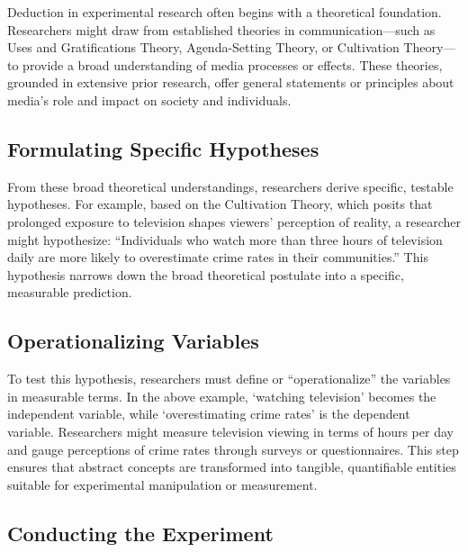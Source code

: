 \documentclass[
  b5paper]{book}
\begin{document}
Deduction in experimental research often begins with a theoretical foundation. Researchers might draw from established theories in communication---such as Uses and Gratifications Theory, Agenda-Setting Theory, or Cultivation Theory---to provide a broad understanding of media processes or effects. These theories, grounded in extensive prior research, offer general statements or principles about media's role and impact on society and individuals.

\hypertarget{formulating-specific-hypotheses}{%
\subsection*{Formulating Specific Hypotheses}\label{formulating-specific-hypotheses}}

From these broad theoretical understandings, researchers derive specific, testable hypotheses. For example, based on the Cultivation Theory, which posits that prolonged exposure to television shapes viewers' perception of reality, a researcher might hypothesize: ``Individuals who watch more than three hours of television daily are more likely to overestimate crime rates in their communities.'' This hypothesis narrows down the broad theoretical postulate into a specific, measurable prediction.

\hypertarget{operationalizing-variables}{%
\subsection*{Operationalizing Variables}\label{operationalizing-variables}}

To test this hypothesis, researchers must define or ``operationalize'' the variables in measurable terms. In the above example, `watching television' becomes the independent variable, while `overestimating crime rates' is the dependent variable. Researchers might measure television viewing in terms of hours per day and gauge perceptions of crime rates through surveys or questionnaires. This step ensures that abstract concepts are transformed into tangible, quantifiable entities suitable for experimental manipulation or measurement.

\hypertarget{conducting-the-experiment}{%
\subsection*{Conducting the Experiment}\label{conducting-the-experiment}}
\end{document}
